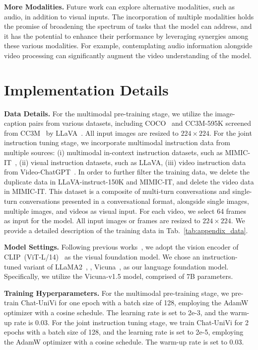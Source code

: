 \documentclass[10pt,twocolumn,letterpaper]{article}
\newcommand{\myparagraph}[1]{\textbf{#1}\hspace{1.8ex}}
\begin{document}
\noindent \myparagraph{More Modalities.}
Future work can explore alternative modalities, such as audio, in addition to visual inputs. The incorporation of multiple modalities holds the promise of broadening the spectrum of tasks that the model can address, and it has the potential to enhance their performance by leveraging synergies among these various modalities. For example, contemplating audio information alongside video processing can significantly augment the video understanding of the model.

\section{Implementation Details}\label{Experimental Setup1}
\noindent \myparagraph{Data Details.} For the multimodal pre-training stage, we utilize the image-caption pairs from various datasets, including COCO~\cite{chen2015microsoft} and CC3M-595K screened from CC3M~\cite{sharma2018conceptual} by LLaVA~\cite{liu2023visual}. All input images are resized to $224\times224$. For the joint instruction tuning stage, we incorporate multimodal instruction data from multiple sources: (i) multimodal in-context instruction datasets, such as MIMIC-IT~\cite{li2023otter,antol2015vqa,hudson2019gqa}, (ii) visual instruction datasets, such as LLaVA, (iii) video instruction data from Video-ChatGPT~\cite{maaz2023video}. In order to further filter the training data, we delete the duplicate data in LLaVA-instruct-150K and MIMIC-IT, and delete the video data in MIMIC-IT. This dataset is a composite of multi-turn conversations and single-turn conversations presented in a conversational format, alongside single images, multiple images, and videos as visual input. For each video, we select 64 frames as input for the model. All input images or frames are resized to $224\times224$. We provide a detailed description of the training data in Tab.~\ref{tab:appendix_data}.

\noindent \myparagraph{Model Settings.} Following previous works~\cite{liu2023visual}, we adopt the vision encoder of CLIP~(ViT-L/14)~\cite{radford2021learning} as the visual foundation model. We chose an instruction-tuned variant of LLaMA2~\cite{touvron2023llama2}, \ie, Vicuna~\cite{vicuna}, as our language foundation model. Specifically, we utilize the Vicuna-v1.5 model, comprised of 7B parameters.

\noindent \myparagraph{Training Hyperparameters.}
For the multimodal pre-training stage, we pre-train Chat-UniVi for one epoch with a batch size of 128, employing the AdamW optimizer with a cosine schedule. The learning rate is set to 2e-3, and the warm-up rate is 0.03. For the joint instruction tuning stage, we train Chat-UniVi for 2 epochs with a batch size of 128, and the learning rate is set to 2e-5, employing the AdamW optimizer with a cosine schedule. The warm-up rate is set to 0.03.
\end{document}
